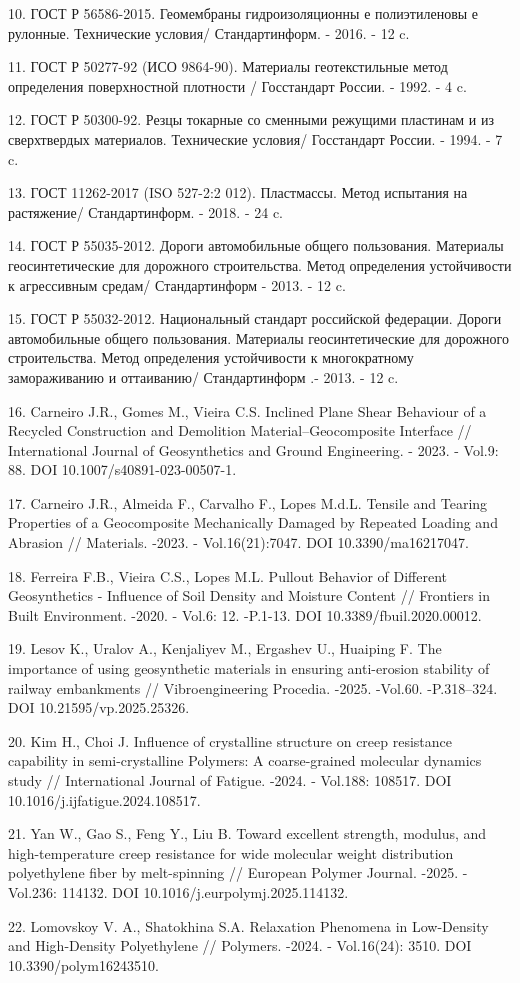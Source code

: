 \begin{refs}
10. ГОСТ Р 56586-2015. Геомембраны гидроизоляционны е полиэтиленовы е
рулонные. Технические условия/ Стандартинформ. - 2016. - 12 c.

11. ГОСТ Р 50277-92 (ИСО 9864-90). Материалы геотекстильные метод
определения поверхностной плотности / Госстандарт России. - 1992. - 4 c.

12. ГОСТ Р 50300-92. Резцы токарные со сменными режущими пластинам и из
сверхтвердых материалов. Технические условия/ Госстандарт России. -
1994. - 7 c.

13. ГОСТ 11262-2017 (ISO 527-2:2 012). Пластмассы. Метод испытания на
растяжение/ Стандартинформ. - 2018. - 24 c.

14. ГОСТ Р 55035-2012. Дороги автомобильные общего пользования.
Материалы геосинтетические для дорожного строительства. Метод
определения устойчивости к агрессивным средам/ Стандартинформ - 2013. -
12 c.

15. ГОСТ Р 55032-2012. Национальный стандарт российской федерации.
Дороги автомобильные общего пользования. Материалы геосинтетические для
дорожного строительства. Метод определения устойчивости к многократному
замораживанию и оттаиванию/ Стандартинформ .- 2013. - 12 c.

16. Carneiro J.R., Gomes M., Vieira C.S. Inclined Plane Shear Behaviour
of a Recycled Construction and Demolition Material--Geocomposite
Interface // International Journal of Geosynthetics and Ground
Engineering. - 2023. - Vol.9: 88. DOI 10.1007/s40891-023-00507-1.

17. Carneiro J.R., Almeida F., Carvalho F., Lopes M.d.L. Tensile and
Tearing Properties of a Geocomposite Mechanically Damaged by Repeated
Loading and Abrasion // Materials. -2023. - Vol.16(21):7047. DOI
10.3390/ma16217047.

18. Ferreira F.B., Vieira C.S., Lopes M.L. Pullout Behavior of Different
Geosynthetics - Influence of Soil Density and Moisture Content //
Frontiers in Built Environment. -2020. - Vol.6: 12. -P.1-13. DOI
10.3389/fbuil.2020.00012.

19. Lesov K., Uralov A., Kenjaliyev M., Ergashev U., Huaiping F. The
importance of using geosynthetic materials in ensuring anti-erosion
stability of railway embankments // Vibroengineering Procedia. -2025.
-Vol.60. -P.318--324. DOI 10.21595/vp.2025.25326.

20. Kim H., Choi J. Influence of crystalline structure on creep
resistance capability in semi-crystalline Polymers: A coarse-grained
molecular dynamics study // International Journal of Fatigue. -2024. -
Vol.188: 108517. DOI 10.1016/j.ijfatigue.2024.108517.

21. Yan W., Gao S., Feng Y., Liu B. Toward excellent strength, modulus,
and high-temperature creep resistance for wide molecular weight
distribution polyethylene fiber by melt-spinning // European Polymer
Journal. -2025. -Vol.236: 114132. DOI 10.1016/j.eurpolymj.2025.114132.

22. Lomovskoy V. A., Shatokhina S.A. Relaxation Phenomena in Low-Density
and High-Density Polyethylene // Polymers. -2024. - Vol.16(24): 3510.
DOI 10.3390/polym16243510.
\end{refs}

